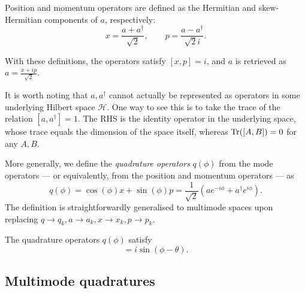 \documentclass[12pt]{report}
\newcommand{\calH}{{\mathcal{H}}}
\begin{document}
\begin{defn}
	Position and momentum operators are defined as the Hermitian and skew-Hermitian components of $a$, respectively:
	\begin{equation}
		x = \frac{a + a^\dagger}{\sqrt2},
		\qquad
		p = \frac{a - a^\dagger}{\sqrt2 i}.
	\end{equation}
\end{defn}
With these definitions, the operators satisfy $[x,p]=i$, and $a$ is retrieved as
$a = \frac{x + ip}{\sqrt2}$.

It is worth noting that $a,a^\dagger$ cannot actually be represented as operators in some underlying Hilbert space $\calH$. One way to see this is to take the trace of the relation $[a,a^\dagger]=1$.
The RHS is the identity operator in the underlying space, whose trace equals the dimension of the space itself, whereas $\Tr([A,B])=0$ for any $A,B$.

\begin{defn}
	More generally, we define the \emph{quadrature operators} $q(\phi)$ from the mode operators --- or equivalently, from the position and momentum operators --- as
	\begin{equation}
		q(\phi) = \cos(\phi) x + \sin(\phi) p
		= \frac{1}{\sqrt2}(a e^{-i\phi} + a^\dagger e^{i\phi}).
	\end{equation}
	The definition is straightforwardly generalised to multimode spaces upon replacing $q\to q_k, a\to a_k, x\to x_k,p\to p_k$.
\end{defn}

\begin{prop}
	The quadrature operators $q(\phi)$ satisfy
	\begin{equation}
		[q(\theta), q(\phi)] = i \sin(\phi-\theta).
	\end{equation}
\end{prop}

\subsection{Multimode quadratures}
\end{document}
